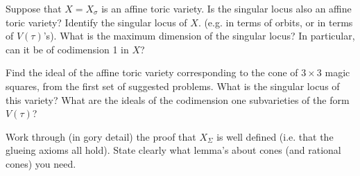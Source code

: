 \documentclass{exam}
\begin{document}
\begin{questions}
  \question Suppose that $X = X_\sigma$ is an affine toric variety.  Is the
  singular locus also an affine toric variety?  Identify the singular locus of $X$.
  (e.g. in terms of orbits, or in terms of $V(\tau)$'s).  What is the maximum
  dimension of the singular locus?  In particular, can it be of codimension 1 in $X$?


  \question Find the ideal of the affine toric variety corresponding to the cone
  of $3 \times 3$ magic squares, from the first set of suggested problems.  What is the
  singular locus of this variety?  What are the ideals of the codimension one
  subvarieties of the form $V(\tau)$?

  \question Work through (in gory detail) the proof that $X_\Sigma$ is well defined (i.e. that the
  glueing axioms all hold).  State clearly what lemma's about cones (and rational cones) you need.
\end{questions}
\end{document}
